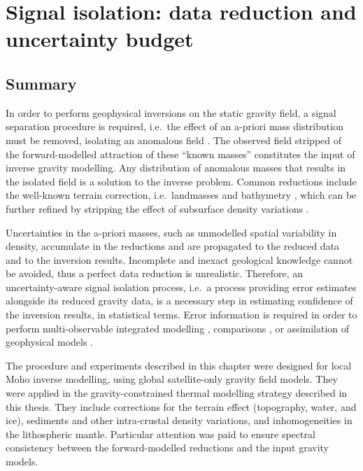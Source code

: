 \chapter{Signal isolation: data reduction and uncertainty budget}
\label{c:SigIs}

\section*{Summary}
\label{s:SigIs:Summary}
In order to perform geophysical inversions on the static gravity field, a signal separation procedure is required, i.e.~the effect of an a-priori mass distribution must be removed, isolating an anomalous field \parencites[e.g.][]{Tenzer2009}{Tenzer2012refined}{Sjoberg2013}[][and references therein]{Aitken2015}.
The observed field stripped of the forward-modelled attraction of these ``known masses'' constitutes the input of inverse gravity modelling.
Any distribution of anomalous masses that results in the isolated field is a solution to the inverse problem.
Common reductions include the well-known terrain correction, i.e.~landmasses and bathymetry \parencites{Hinze2003}{Hinze2005}, which can be further refined by stripping the effect of subsurface density variations \parencite{Vajda2008}.

Uncertainties in the a-priori masses, such as unmodelled spatial variability in density, accumulate in the reductions and are propagated to the reduced data and to the inversion results.
Incomplete and inexact geological knowledge cannot be avoided, thus a perfect data reduction is unrealistic.
Therefore, an uncertainty-aware signal isolation process, i.e.~a process providing error estimates alongside its reduced gravity data, is a necessary step in estimating confidence of the inversion results, in statistical terms.
Error information is required in order to perform multi-observable integrated modelling \parencite[e.g.][]{Afonso2013}, comparisons \parencite[e.g.][]{Root2017}, or assimilation of geophysical models \parencites[e.g.~to assemble large scale maps from local studies, see][]{Tesauro2008}{Grad2009}{Molinari2011}.

The procedure and experiments described in this chapter were designed for local Moho inverse modelling, using global satellite-only gravity field models.
They were applied in the gravity-constrained thermal modelling strategy described in this thesis.
They include corrections for the terrain effect (topography, water, and ice), sediments and other intra-crustal density variations, and inhomogeneities in the lithospheric mantle.
Particular attention was paid to ensure spectral consistency between the forward-modelled reductions and the input gravity models.

